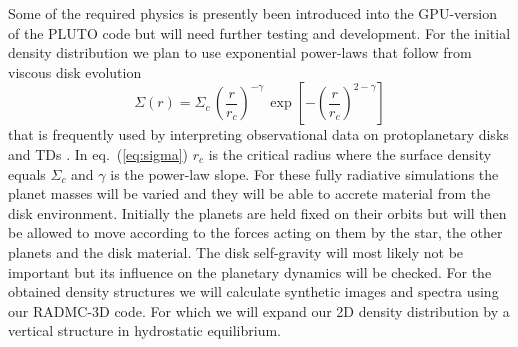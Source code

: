 \documentclass[10pt,fleqn,twoside]{article}
\newcommand{\beq}{\begin{equation}}
\newcommand{\eeq}{\end{equation}}
\begin{document}
\begin{description}
Some of the required physics is presently been introduced into the GPU-version of the PLUTO code but will need 
further testing and development. 
For the initial density distribution we plan to use exponential power-laws that follow from viscous disk evolution
\beq
\label{eq:sigma}
    \Sigma(r) = \Sigma_c \, \left( \frac{r}{r_c} \right)^{-\gamma} \, \exp \left[ - \left(\frac{r}{r_c}\right)^{2 -\gamma} \right] 
\eeq
that is frequently used by interpreting observational data on protoplanetary disks \citep{2011ARA&A..49...67W}
and TDs \citep[see e.g.][]{2015A&A...579A.106V}.
In eq.~(\ref{eq:sigma}) $r_c$ is the critical radius where the surface density equals $\Sigma_c$ and
$\gamma$ is the power-law slope.
For these fully radiative simulations the planet masses will be varied and they will be able
to accrete material from the disk environment. Initially the planets are held fixed on their orbits but will
then be allowed to move according to the forces acting on them by the star, the other planets and the disk material.
The disk self-gravity will most likely not be important but its influence on the planetary dynamics will be checked.
For the obtained density structures we will calculate synthetic images and spectra using our RADMC-3D code.
For which we will expand our 2D density distribution by a vertical structure in hydrostatic equilibrium.

 


\end{description}
\end{document}
